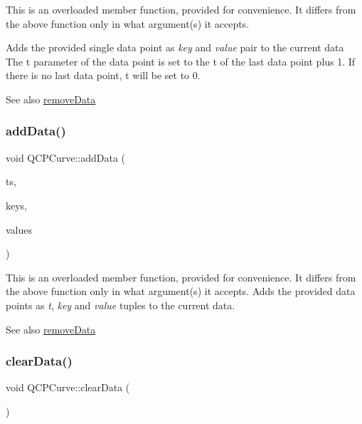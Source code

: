 This is an overloaded member function, provided for convenience. It differs from the above function only in what argument(s) it accepts.

Adds the provided single data point as {\itshape key} and {\itshape value} pair to the current data The t parameter of the data point is set to the t of the last data point plus 1. If there is no last data point, t will be set to 0.

\begin{DoxySeeAlso}{See also}
\hyperlink{class_q_c_p_curve_ad45bb5479be799163028ef2b776f7221}{remove\+Data} 
\end{DoxySeeAlso}
\hypertarget{class_q_c_p_curve_a27c8b3dddd4067d626397ee199626722}{}\label{class_q_c_p_curve_a27c8b3dddd4067d626397ee199626722} 
\subsubsection{\texorpdfstring{add\+Data()}{addData()}\hspace{0.1cm}{\footnotesize\ttfamily [5/5]}}
{\footnotesize\ttfamily void Q\+C\+P\+Curve\+::add\+Data (\begin{DoxyParamCaption}\item[{const Q\+Vector$<$ double $>$ \&}]{ts,  }\item[{const Q\+Vector$<$ double $>$ \&}]{keys,  }\item[{const Q\+Vector$<$ double $>$ \&}]{values }\end{DoxyParamCaption})}

This is an overloaded member function, provided for convenience. It differs from the above function only in what argument(s) it accepts. Adds the provided data points as {\itshape t}, {\itshape key} and {\itshape value} tuples to the current data. \begin{DoxySeeAlso}{See also}
\hyperlink{class_q_c_p_curve_ad45bb5479be799163028ef2b776f7221}{remove\+Data} 
\end{DoxySeeAlso}
\hypertarget{class_q_c_p_curve_ae0462c61dbfbac07db0736ec64110241}{}\label{class_q_c_p_curve_ae0462c61dbfbac07db0736ec64110241} 
\subsubsection{\texorpdfstring{clear\+Data()}{clearData()}}
{\footnotesize\ttfamily void Q\+C\+P\+Curve\+::clear\+Data (\begin{DoxyParamCaption}{ }\end{DoxyParamCaption})\hspace{0.3cm}{\ttfamily [virtual]}}

